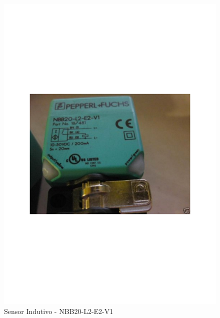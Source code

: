 \newpage

\begin{figure}[h!]
 \centering
 \includegraphics[width=1\columnwidth]{Indutivo/foto}
 \caption{Sensor Indutivo - NBB20-L2-E2-V1 }
\end{figure}
\newpage

